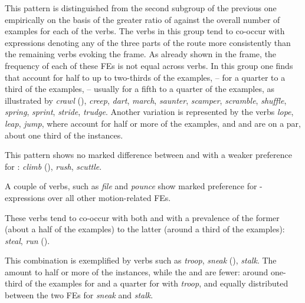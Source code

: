\documentclass[output=paper,colorlinks,citecolor=brown]{langscibook}
\begin{document}
\begin{description}[font=\normalfont]
\item[\fename{Path}, \fename{Goal} or \fename{Source}:] This pattern is distinguished from the second subgroup of the previous one empirically on the basis of the greater ratio of  against the overall number of examples for each of the verbs. The verbs in this group tend to co-occur with expressions denoting any of the three parts of the route more consistently than the remaining verbs evoking the  fra\-me. As already shown in the  frame, the frequency of each of these FEs is not equal across verbs. In this group one finds that  account for half to up to two-thirds of the examples,  -- for a quarter to a third of the examples,  -- usually for a fifth to a quarter of the examples, as illustrated by \textit{crawl} (), \textit{creep}, \textit{dart}, \textit{march}, \textit{saunter}, \textit{scamper}, \textit{scramble}, \textit{shuffle}, \textit{spring}, \textit{sprint}, \textit{stride}, \textit{trudge}. Another variation is represented by the verbs \textit{lope}, \textit{leap}, \textit{jump}, where  account for half or more of the examples, and  and  are on a par, about one third of the instances. %

\item[\fename{Paths} = \fename{Goals} or \fename{Source}:] This pattern shows no marked difference between  and  with a weaker preference for : \textit{climb} (), \textit{rush}, \textit{scuttle}.

\item[\fename{Goal}:] A couple of verbs, such as \textit{file} and \textit{pounce} show marked preference for -expressions over all other motion-related FEs. 

\item[\fename{Goal} or \fename{Path}:] These verbs tend to co-occur with both  and  with a prevalence of the former (about a half of the examples) to the latter (around a third of the examples): \textit{steal}, \textit{run} ().
							
\item[\fename{Goal}, \fename{Path} or \fename{Source}:] This combination is exemplified by verbs such as \textit{troop}, \textit{sneak} (), \textit{stalk}. The  amount to half or more of the instances, while the  and  are fewer: around one-third of the examples for  and a quarter for  with \textit{troop}, and equally distributed between the two FEs for \textit{sneak} and \textit{stalk}. %
\end{description}
\end{document}
